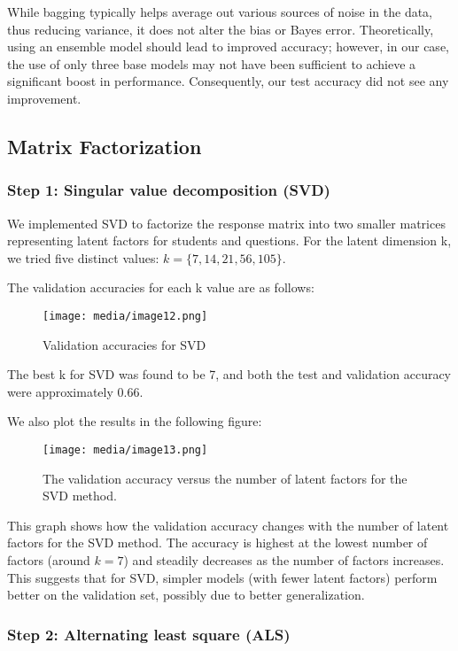 \documentclass{article}
\begin{document}
While bagging typically helps average out various sources of noise in the data, thus reducing variance, it does not alter the bias or Bayes error. Theoretically, using an ensemble model should lead to improved accuracy; however, in our case, the use of only three base models may not have been sufficient to achieve a significant boost in performance. Consequently, our test accuracy did not see any improvement.

\subsection{Matrix Factorization}

\subsubsection{Step 1: Singular value decomposition (SVD)}

We implemented SVD to factorize the response matrix into two smaller matrices representing latent factors for students and questions. For the latent dimension k, we tried five distinct values: $k = \{7, 14, 21, 56, 105\}$.

The validation accuracies for each k value are as follows:

\begin{figure}[htbp]
\centering
\texttt{[image: media/image12.png]}
\caption{Validation accuracies for SVD}
\end{figure}

The best k for SVD was found to be 7, and both the test and validation accuracy were approximately 0.66.

We also plot the results in the following figure:

\begin{figure}[htbp]
\centering
\texttt{[image: media/image13.png]}
\caption{The validation accuracy versus the number of latent factors for the SVD method.}
\end{figure}

This graph shows how the validation accuracy changes with the number of latent factors for the SVD method. The accuracy is highest at the lowest number of factors (around $k = 7$) and steadily decreases as the number of factors increases. This suggests that for SVD, simpler models (with fewer latent factors) perform better on the validation set, possibly due to better generalization.

\subsubsection{Step 2: Alternating least square (ALS)}
\end{document}
